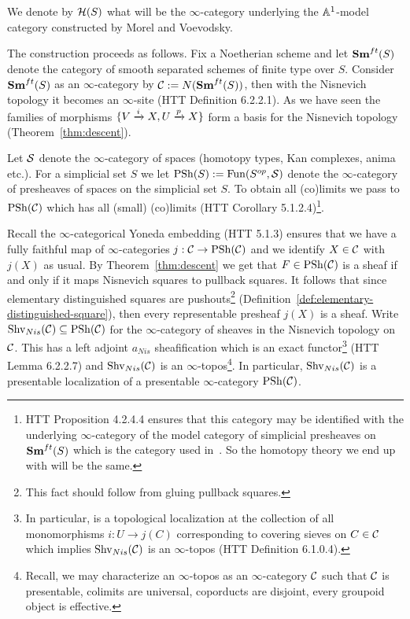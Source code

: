 \documentclass[12pt]{article}
\numberwithin{equation}{section}
\numberwithin{lemma}{section}
\numberwithin{theorem}{section}
\numberwithin{proposition}{section}
\numberwithin{corollary}{section}
\numberwithin{definition}{section}
\numberwithin{example}{section}
\numberwithin{remark}{section}
\begin{document}
We denote by $\mathcal{H}(S)$ what will be the $\infty$-category underlying
the $\mathbb A^1$-model category constructed by Morel and Voevodsky.

The construction proceeds as follows. Fix a Noetherian scheme and let
$\mathbf{Sm}^{ft}(S)$ denote the category of smooth separated schemes of
finite type over $S$. Consider $\mathbf{Sm}^{ft}(S)$ as an $\infty$-category
by $\mathcal{C} := N(\mathbf{Sm}^{ft}(S))$, then with the Nisnevich topology it
becomes an $\infty$-site (HTT Definition 6.2.2.1). As we have seen the
families of morphisms $\{V \xrightarrow{i} X, U \xrightarrow{p} X\}$ form a basis for the
Nisnevich topology (Theorem~\ref{thm:descent}).

Let $\mathcal{S}$ denote the $\infty$-category of spaces (homotopy types, Kan
complexes, anima etc.). For a simplicial set $S$ we let
$\operatorname{PSh}(S) := \operatorname{Fun}(S^{op}, \mathcal{S})$ denote the $\infty$-category of
presheaves of spaces on the simplicial set $S$. To obtain all
(co)limits we pass to $\operatorname{PSh}(\mathcal{C})$ which has all (small) (co)limits
(HTT Corollary 5.1.2.4)\footnote{HTT Proposition 4.2.4.4 ensures that
  this category may be identified with the underlying
  $\infty$-category of the model category of simplicial presheaves on
  $\mathbf{Sm}^{ft}(S)$ which is the category used in~\cite{morel1999}. So the
  homotopy theory we end up with will be the same.}.

Recall the $\infty$-categorical Yoneda embedding (HTT 5.1.3) ensures
that we have a fully faithful map of $\infty$-categories
$j : \mathcal{C} \to \operatorname{PSh}(\mathcal{C})$ and we identify $X \in \mathcal{C}$ with $j(X)$ as
usual. By Theorem~\ref{thm:descent} we get that $F \in \operatorname{PSh}(\mathcal{C})$ is a
sheaf if and only if it maps Nisnevich squares to pullback squares. It
follows that since elementary distinguished squares are
pushouts\footnote{This fact should follow from gluing pullback
  squares.} (Definition~\ref{def:elementary-distinguished-square}),
then every representable presheaf $j(X)$ is a sheaf. Write
$\operatorname{Shv}_{Nis}(\mathcal{C}) \subseteq \operatorname{PSh}(\mathcal{C})$ for the $\infty$-category of
sheaves in the Nisnevich topology on $\mathcal{C}$. This has a left adjoint
$a_{Nis}$ sheafification which is an exact functor\footnote{In
  particular, is a topological localization at the collection of all
  monomorphisms $i : U \to j(C)$ corresponding to covering sieves on
  $C \in \mathcal{C}$ which implies $\operatorname{Shv}_{Nis}(\mathcal{C})$ is an $\infty$-topos
  (HTT Definition 6.1.0.4).}  (HTT Lemma 6.2.2.7) and
$\operatorname{Shv}_{Nis}(\mathcal{C})$ is an $\infty$-topos\footnote{Recall, we may
  characterize an $\infty$-topos as an $\infty$-category $\mathcal{C}$ such
  that $\mathcal{C}$ is presentable, colimits are universal, coporducts are
  disjoint, every groupoid object is effective.}. In particular,
$\operatorname{Shv}_{Nis}(\mathcal{C})$ is a presentable localization of a presentable
$\infty$-category $\operatorname{PSh}(\mathcal{C})$.
\end{document}
